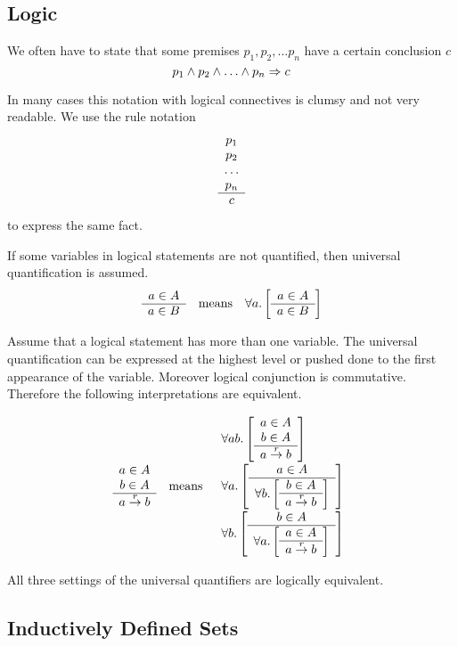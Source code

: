 \subsection{Logic}

We often have to state that some premises $p_1, p_2, \ldots p_n$ have a certain
conclusion $c$
$$
p_1 \land p_2 \land \ldots \land p_n \Rightarrow c
$$

In many cases this notation with logical connectives is clumsy and not very
readable. We use the rule notation
$$
\begin{array}{c} p_1 \\ p_2 \\ \ldots \\ p_n \\ \hline c\end{array}
$$
to express the same fact.


If some variables in logical statements are not quantified, then universal
quantification is assumed.
$$
\begin{array}{ccc}

    \ruleh{a \in A}{a \in B}
    &
    \text{means}
    &
    \allbracket a {\ruleh {a \in A}{a \in B}}

\end{array}
$$

Assume that a logical statement has more than one variable. The universal
quantification can be expressed at the highest level or pushed done to the first
appearance of the variable. Moreover logical conjunction is commutative.
Therefore the following interpretations are equivalent.

$$
\begin{array}{ccc}
    \begin{array}{c} a \in A \\ b \in A \\ \hline a \stackrel{r}{\to} b\end{array}
    &
    \text{means}
    &
    \begin{array}{l}
        \forall ab. \left[ \begin{array}{c} a \in A \\ b \in A \\ \hline a \stackrel{r}{\to} b\end{array} \right]
        \\
        \forall a. \left[ 
            \begin{array}{c} a \in A \\ \hline \forall b. \left[ \begin{array}{c} b \in A \\ \hline a \stackrel{r}{\to} b\end{array} \right]\end{array}
         \right]
        \\
        \forall b. \left[ 
            \begin{array}{c} b \in A \\ \hline \forall a. \left[ \begin{array}{c} a \in A \\ \hline a \stackrel{r}{\to} b\end{array} \right]\end{array}
         \right]
    \end{array}
\end{array}
$$

All three settings of the universal quantifiers are logically equivalent.




\subsection{Inductively Defined Sets}

